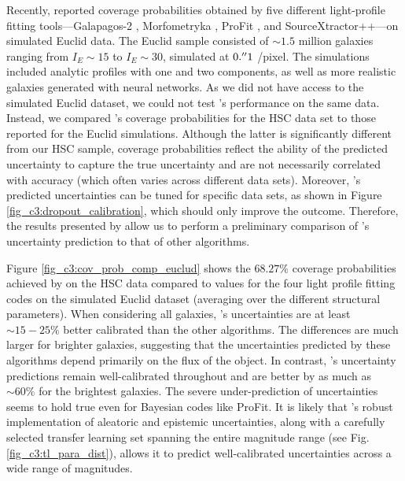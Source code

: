 Recently, \citet{euclid_morph} reported coverage probabilities obtained by five different light-profile fitting tools---Galapagos-2 \citep{galapagos}, Morfometryka \citep{morfometryka}, ProFit \citep{profit}, and SourceXtractor++\citep{srcx++}---on simulated Euclid data. The Euclid sample consisted of $\sim1.5$ million galaxies ranging from $I_E\sim15$ to $I_E\sim30$, simulated at $0.\mbox{$^{\prime\prime}$}1$ /pixel. The simulations included analytic \sersic{} profiles with one and two components, as well as more realistic galaxies generated with neural networks. 
As we did not have access to the simulated Euclid dataset, we could not test \gampen{}'s performance on the same data. 
Instead, we compared \gampen{}'s coverage probabilities for the HSC data set to those reported for the Euclid simulations. 
Although the %
latter is significantly different from our HSC sample, coverage probabilities reflect the ability of the predicted uncertainty to capture the true uncertainty and are not necessarily correlated with accuracy (which often varies across different data sets). Moreover, \gampen{}'s predicted uncertainties can be tuned for specific data sets, as shown in Figure \ref{fig_c3:dropout_calibration}, which should only improve the \gampen{} outcome. Therefore, the results presented by \citet{euclid_morph} allow us to perform a preliminary comparison of \gampen{}'s uncertainty prediction to that of other algorithms.

Figure \ref{fig_c3:cov_prob_comp_euclud} shows the $68.27\%$ coverage probabilities achieved by \gampen{} on the HSC data compared to values for the four light profile fitting codes on the simulated Euclid dataset %
(averaging over the different structural parameters). %
When considering all galaxies, \gampen{}'s uncertainties are at least $\sim15-25\%$ better calibrated than the other algorithms. 
The differences are much larger for brighter galaxies,
suggesting that the uncertainties predicted by these algorithms depend primarily on the flux of the object. In contrast, \gampen{}'s uncertainty predictions remain well-calibrated throughout and are better by as much as $\sim60\%$ for the brightest galaxies. The severe under-prediction of uncertainties seems to hold true even for Bayesian codes like ProFit. 
It is likely that 
\gampen{}'s robust implementation of aleatoric and epistemic uncertainties, along with a carefully selected transfer learning set spanning the entire magnitude range (see Fig. \ref{fig_c3:tl_para_dist}), allows it to predict well-calibrated uncertainties across a wide range of magnitudes. 



